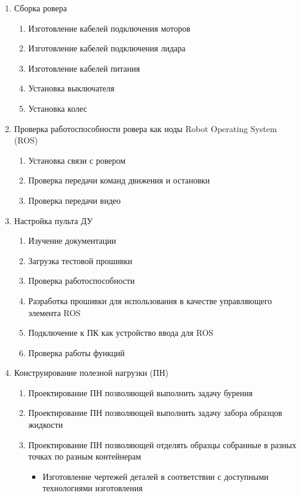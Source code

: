 \begin{enumerate}
    \item Сборка ровера
    \begin{enumerate}
        \item Изготовление кабелей подключения моторов
        \item Изготовление кабелей подключения лидара
        \item Изготовление кабелей питания
        \item Установка выключателя
        \item Установка колес
    \end{enumerate}
    \item Проверка работоспособности ровера как ноды Robot Operating System (ROS)
    \begin{enumerate}
        \item Установка связи с ровером 
        \item Проверка передачи команд движения и остановки 
        \item Проверка передачи видео 
    \end{enumerate}
    \item Настройка пульта ДУ
    \begin{enumerate}
        \item Изучение документации
        \item Загрузка тестовой прошивки
        \item Проверка работоспособности
        \item Разработка прошивки для использования в качестве управляющего элемента ROS
        \item Подключение к ПК как устройство ввода для ROS
        \item Проверка работы функций 
    \end{enumerate}
    \item Конструирование полезной нагрузки (ПН)
    \begin{enumerate}
        \item Проектирование ПН позволяющей выполнить задачу бурения
        \item Проектирование ПН позволяющей выполнить задачу забора образцов жидкости
        \item Проектирование ПН позволяющей отделять образцы собранные в разных точках по разным контейнерам
        \begin{itemize}
            \item Изготовление чертежей деталей в соответствии с доступными технологиями изготовления

\end{itemize}
\end{enumerate}
\end{enumerate}
